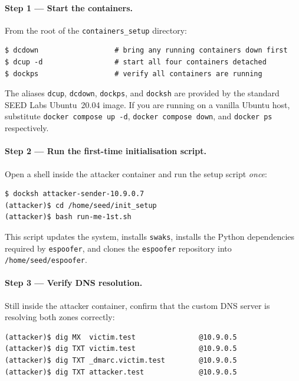 \documentclass[11pt]{article}
\begin{document}
\paragraph{Step 1 --- Start the containers.}
From the root of the \texttt{containers\_setup} directory:

\begin{listing}[H]
\begin{verbatim}
$ dcdown                  # bring any running containers down first
$ dcup -d                 # start all four containers detached
$ dockps                  # verify all containers are running
\end{verbatim}
\end{listing}

The aliases \texttt{dcup}, \texttt{dcdown}, \texttt{dockps}, and
\texttt{docksh} are provided by the standard SEED Labs Ubuntu~20.04
image. If you are running on a vanilla Ubuntu host, substitute
\texttt{docker compose up -d}, \texttt{docker compose down}, and
\texttt{docker ps} respectively.

\paragraph{Step 2 --- Run the first-time initialisation script.}
Open a shell inside the attacker container and run the setup script
\emph{once}:

\begin{listing}[H]
\begin{verbatim}
$ docksh attacker-sender-10.9.0.7
(attacker)$ cd /home/seed/init_setup
(attacker)$ bash run-me-1st.sh
\end{verbatim}
\end{listing}

This script updates the system, installs \texttt{swaks}, installs the
Python dependencies required by \texttt{espoofer}, and clones the
\texttt{espoofer} repository into \texttt{/home/seed/espoofer}.

\paragraph{Step 3 --- Verify DNS resolution.}
Still inside the attacker container, confirm that the custom DNS server
is resolving both zones correctly:

\begin{listing}[H]
\begin{verbatim}
(attacker)$ dig MX  victim.test               @10.9.0.5
(attacker)$ dig TXT victim.test               @10.9.0.5
(attacker)$ dig TXT _dmarc.victim.test        @10.9.0.5
(attacker)$ dig TXT attacker.test             @10.9.0.5
\end{verbatim}
\end{listing}
\end{document}
